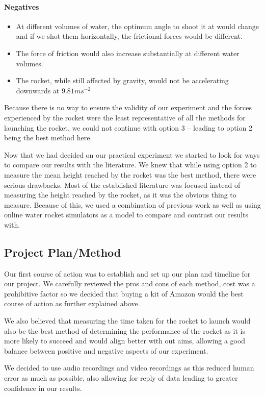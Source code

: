 \documentclass[14pt]{article}
\begin{document}
\paragraph{Negatives}
\begin{itemize}
    \item At different volumes of water, the optimum angle to shoot it at would change and if we shot them horizontally, the frictional forces would be different.
    \item The force of friction would also increase substantially at different water volumes.
    \item The rocket, while still affected by gravity, would not be accelerating downwards at \(9.81ms^{-2}\)
\end{itemize}


Because there is no way to ensure the validity of our experiment and the forces experienced by the rocket were the least representative of all the methods for launching the rocket, we could not continue with option 3 -- leading to option 2 being the best method here.

Now that we had decided on our practical experiment we started to look for ways to compare our results with the literature. We knew that while using option 2 to measure the mean height reached by the rocket was the best method, there were serious drawbacks. Most of the established literature was focused instead of measuring the height reached by the rocket, as it was the obvious thing to measure. Because of this, we used a combination of previous work as well as using online water rocket simulators as a model to compare and contrast our results with.

\subsection{Project Plan/Method}
Our first course of action was to establish and set up our plan and timeline for our project. We carefully reviewed the pros and cons of each method, cost was a prohibitive factor so we decided that buying a kit of Amazon would the best course of action as further explained above. 

We also believed that measuring the time taken for the rocket to launch would also be the best method of determining the performance of the rocket as it is more likely to succeed and would align better with out aims, allowing a good balance between positive and negative aspects of our experiment. 

We decided to use audio recordings and video recordings as this reduced human error as much as possible, also allowing for reply of data leading to greater confidence in our results.
\end{document}
